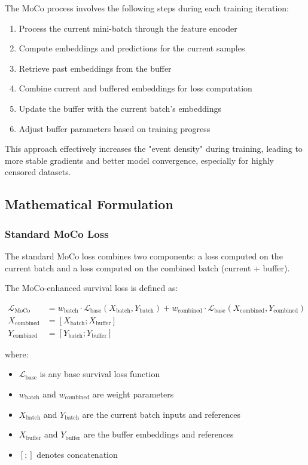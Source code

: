 The MoCo process involves the following steps during each training iteration:
\begin{enumerate}
\item Process the current mini-batch through the feature encoder
\item Compute embeddings and predictions for the current samples
\item Retrieve past embeddings from the buffer
\item Combine current and buffered embeddings for loss computation
\item Update the buffer with the current batch's embeddings
\item Adjust buffer parameters based on training progress
\end{enumerate}

This approach effectively increases the "event density" during training, leading to more stable gradients and better model convergence, especially for highly censored datasets.

\subsection{Mathematical Formulation}

\subsubsection{Standard MoCo Loss}

The standard MoCo loss combines two components: a loss computed on the current batch and a loss computed on the combined batch (current + buffer).

\begin{equationbox}[title=Standard MoCo Survival Loss]
  The MoCo-enhanced survival loss is defined as:

  \begin{align}
    \mathcal{L}_{\text{MoCo}} &= w_{\text{batch}} \cdot \mathcal{L}_{\text{base}}(X_{\text{batch}}, Y_{\text{batch}}) + w_{\text{combined}} \cdot \mathcal{L}_{\text{base}}(X_{\text{combined}}, Y_{\text{combined}})\\
    X_{\text{combined}} &= [X_{\text{batch}}; X_{\text{buffer}}]\\
    Y_{\text{combined}} &= [Y_{\text{batch}}; Y_{\text{buffer}}]
  \end{align}

  where:
  \begin{itemize}
  \item $\mathcal{L}_{\text{base}}$ is any base survival loss function
  \item $w_{\text{batch}}$ and $w_{\text{combined}}$ are weight parameters
  \item $X_{\text{batch}}$ and $Y_{\text{batch}}$ are the current batch inputs and references
  \item $X_{\text{buffer}}$ and $Y_{\text{buffer}}$ are the buffer embeddings and references
  \item $[;]$ denotes concatenation
  \end{itemize}
\end{equationbox}

